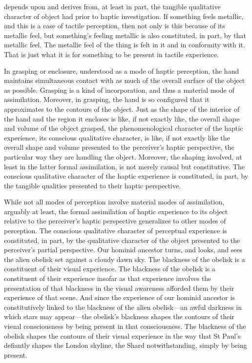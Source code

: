 depends upon and derives from, at least in part, the tangible qualitative character of object had prior to haptic investigation. If something feels metallic, and this is a case of tactile perception, then not only is this because of its metallic feel, but something's feeling metallic is also constituted, in part, by that metallic feel. The metallic feel of the thing is felt in it and in conformity with it. That is just what it is for something to be present in tactile experience.

In grasping or enclosure, understood as a mode of haptic perception, the hand maintains simultaneous contact with as much of the overall surface of the object as possible. Grasping is a kind of incorporation, and thus a material mode of assimilation. Moreover, in grasping, the hand is so configured that it approximates to the contours of the object. Just as the shape of the interior of the hand and the region it encloses is like, if not exactly like, the overall shape and volume of the object grasped, the phenomenological character of the haptic experience, its conscious qualitative character, is like, if not exactly like the overall shape and volume presented to the perceiver's haptic perspective, the particular way they are handling the object. Moreover, the shaping involved, at least in the latter formal assimilation, is not merely causal but constitutive. The conscious qualitative character of the haptic experience is constituted, in part, by the tangible qualities presented to their haptic perspective.

While not all modes of perception involve material modes of assimilation, arguably at least, the formal assimilation of haptic experience to its object relative to the perceiver's haptic perspective generalizes to other modes of perception. The conscious qualitative character of perceptual experience is constituted, in part, by the qualitative character of the object presented to the perceiver's partial perspective. Our hominid ancestor turns, and looks, and sees the alien obelisk set against a cloudy dawn sky. The blackness of the obelisk is a constituent of their visual experience. The blackness of the obelisk is a constituent of their experience insofar as that experience involves the presentation of that blackness in the visual awareness afforded them by their experience of that scene. And since the experience of our hominid ancestor is constitutively linked to the blackness of the alien obelisk---an awful darkness in which stars may appear---the obelisk’s blackness shapes the contours of their visual consciousness by being present in that consciousness. The blackness of the obelisk shapes the contours of their visual experience in the way that St Paul’s defiantly shapes the London skyline, the Shard notwithstanding, simply by being present. 

